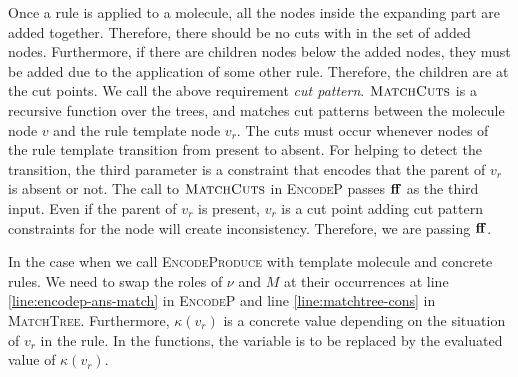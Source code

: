 Once a rule is applied to a molecule, all the
nodes inside the expanding part are added together.
Therefore, there should be no cuts with in the set of added nodes.
Furthermore, if there are children nodes below the added nodes,
they must be added due to the application of some other rule.
Therefore, the children are at the cut points.
We call the above requirement {\em cut pattern}. 
$\textsc{MatchCuts}$ is a recursive function over the trees, and matches
cut patterns between the molecule node $v$ and the rule template node $v_r$.
The cuts must occur whenever nodes of the rule template transition
from present to absent.
For helping to detect the transition,
the third parameter is a constraint that encodes that the parent of $v_r$
is absent or not.
The call to $\textsc{MatchCuts}$ in \textsc{EncodeP} passes $\mathbf{ff}$ as the third input.
Even if the parent of $v_r$ is present,
$v_r$ is a cut point adding cut pattern constraints for the node will create inconsistency.
Therefore, we are passing $\mathbf{ff}$.

In the case when we call \textsc{EncodeProduce} with template molecule and
concrete rules.
We need to swap the roles of $\nu$ and $M$ at their occurrences
at line \ref{line:encodep-ans-match} in \textsc{EncodeP} and
line \ref{line:matchtree-cons} in \textsc{MatchTree}.
Furthermore, $\kappa(v_r)$ is a concrete value depending on the situation of $v_r$ in
the rule.
In the functions, the variable is to be replaced by the
evaluated value of $\kappa(v_r)$.





